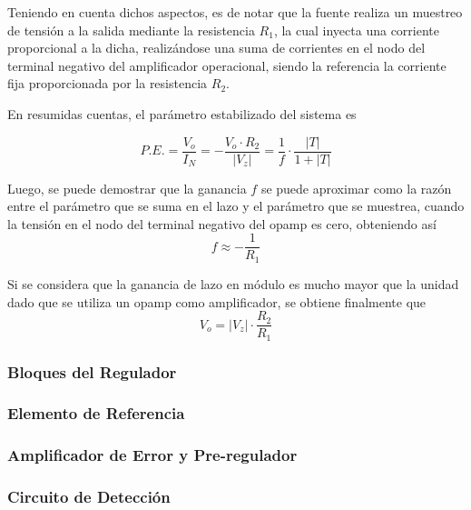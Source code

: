 Teniendo en cuenta dichos aspectos, es de notar que la fuente realiza un muestreo de tensión a la salida mediante la resistencia $R_1$, la cual inyecta una corriente proporcional a la dicha, realizándose una suma de corrientes en el nodo del terminal negativo del amplificador operacional, siendo la referencia la corriente fija proporcionada por la resistencia $R_2$.

En resumidas cuentas, el parámetro estabilizado del sistema es

\begin{equation}
P.E. = \frac{V_o}{I_N} = -\frac{V_o \cdot R_2}{|V_z|} = \frac{1}{f} \cdot \frac{|T|}{1 + |T|}
\end{equation}

Luego, se puede demostrar que la ganancia $f$ se puede aproximar como la razón entre el parámetro que se suma en el lazo y el parámetro que se muestrea, cuando la tensión en el nodo del terminal negativo del opamp es cero, obteniendo así
\begin{equation}
f \approx -\frac{1}{R_1}
\end{equation}

Si se considera que la ganancia de lazo en módulo es mucho mayor que la unidad dado que se utiliza un opamp como amplificador, se obtiene finalmente que
\begin{equation}
V_o = |V_z| \cdot \frac{R_2}{R_1}
\end{equation}

\subsubsection{Bloques del Regulador}
\subsubsection{Elemento de Referencia}
\subsubsection{Amplificador de Error y Pre-regulador}
\subsubsection{Circuito de Detección}
